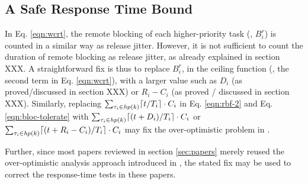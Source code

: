 \subsection{A Safe Response Time Bound}
\label{sec:safe_bound}

In Eq. \ref{eqn:wcrt}, the remote blocking of each higher-priority task (\ie, $B_i^r$) is counted in a similar way as release jitter. However, it is not sufficient to count the duration of remote blocking as release jitter, as already explained in section XXX. A straightforward fix is thus to replace $B_i^r$, in the ceiling function (\ie, the second term in Eq. \ref{eqn:wcrt}), with a larger value such as $D_i$ (as proved/discussed in section XXX) or $R_i - C_i$ (as proved / discussed in section XXX). Similarly, replacing $\sum_{\tau_i \in \mathit{hp}(k)} \lceil t / T_i \rceil \cdot C_i$ in Eq. \ref{eqn:rbf-2} and Eq. \ref{eqn:bloc-tolerate} with $\sum_{\tau_i \in \mathit{hp}(k)} \lceil (t+D_i) / T_i \rceil \cdot C_i$ or $\sum_{\tau_i \in \mathit{hp}(k)} \lceil (t+R_i-C_i) / T_i \rceil \cdot C_i$ may fix the over-optimistic problem in \cite{NBN:11}.

Further, since most papers reviewed in section \ref{sec:papers} merely reused the over-optimistic analysis approach introduced in \cite{lakshmanan-2009}, the stated fix may be used to correct the response-time tests in these papers.